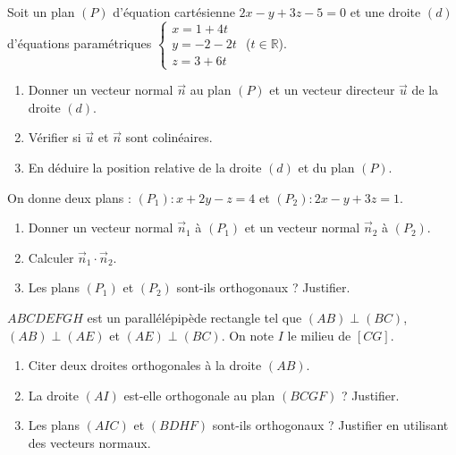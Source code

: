 \documentclass[11pt]{article}
\begin{document}
\begin{exercice}
Soit un plan $(P)$ d'équation cartésienne $2x - y + 3z - 5 = 0$ et une droite $(d)$ d'équations paramétriques 
$\begin{cases} x = 1 + 4t \\ y = -2 - 2t \\ z = 3 + 6t \end{cases}$ ($t \in \mathbb{R}$).
\begin{enumerate}
    \item Donner un vecteur normal $\vec{n}$ au plan $(P)$ et un vecteur directeur $\vec{u}$ de la droite $(d)$.
    \item Vérifier si $\vec{u}$ et $\vec{n}$ sont colinéaires.
    \item En déduire la position relative de la droite $(d)$ et du plan $(P)$.
\end{enumerate}
\end{exercice}

\begin{exercice}
On donne deux plans : $(P_1) : x + 2y - z = 4$ et $(P_2) : 2x - y + 3z = 1$.
\begin{enumerate}
    \item Donner un vecteur normal $\vec{n}_1$ à $(P_1)$ et un vecteur normal $\vec{n}_2$ à $(P_2)$.
    \item Calculer $\vec{n}_1 \cdot \vec{n}_2$.
    \item Les plans $(P_1)$ et $(P_2)$ sont-ils orthogonaux ? Justifier.
\end{enumerate}
\end{exercice}

\begin{exercice}
$ABCDEFGH$ est un parallélépipède rectangle tel que $(AB) \perp (BC)$, $(AB) \perp (AE)$ et $(AE) \perp (BC)$.
On note $I$ le milieu de $[CG]$.
\begin{enumerate}
    \item Citer deux droites orthogonales à la droite $(AB)$.
    \item La droite $(AI)$ est-elle orthogonale au plan $(BCGF)$ ? Justifier.
    \item Les plans $(AIC)$ et $(BDHF)$ sont-ils orthogonaux ? Justifier en utilisant des vecteurs normaux.
\end{enumerate}
\end{exercice}
\end{document}
